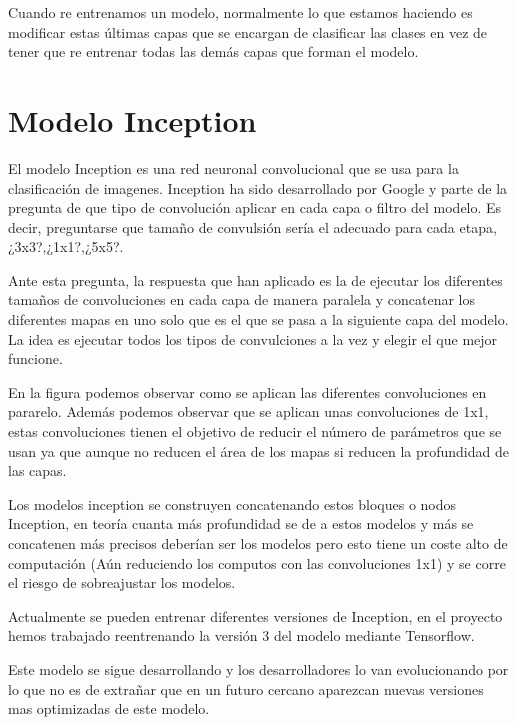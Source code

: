 Cuando re entrenamos un modelo, normalmente lo que estamos haciendo es modificar estas últimas capas que se encargan de clasificar las clases en vez de tener que re entrenar todas las demás capas que forman el modelo.

\section{Modelo Inception}

El modelo Inception es una red neuronal convolucional que se usa para la clasificación de imagenes. Inception ha sido desarrollado por Google y parte de la pregunta de que tipo de convolución aplicar en cada capa o  filtro del modelo. Es decir, preguntarse que tamaño de convulsión sería el adecuado para cada etapa, ¿3x3?,¿1x1?,¿5x5?.

Ante esta pregunta, la respuesta que han aplicado es la de ejecutar los diferentes tamaños de convoluciones en cada capa de manera paralela y concatenar los diferentes mapas en uno solo que es el que se pasa a la siguiente capa del modelo. La idea es ejecutar todos los tipos de convulciones a la vez y elegir el que mejor funcione.


En la figura podemos observar como se aplican las diferentes convoluciones en pararelo. Además podemos observar que se aplican unas convoluciones de 1x1, estas convoluciones tienen el objetivo de reducir el número de parámetros que se usan ya que aunque no reducen el área de los mapas si reducen la profundidad de las capas.

Los modelos inception se construyen concatenando estos bloques o nodos Inception, en teoría cuanta más profundidad se de a estos modelos y más se concatenen más precisos deberían ser los modelos pero esto tiene un coste alto de computación (Aún reduciendo los computos con las convoluciones 1x1) y se corre el riesgo de sobreajustar los modelos.

Actualmente se pueden entrenar diferentes versiones de Inception, en el proyecto hemos trabajado reentrenando la versión 3 del modelo mediante Tensorflow.

Este modelo se sigue desarrollando y los desarrolladores lo van evolucionando por lo que no es de extrañar que en un futuro cercano aparezcan nuevas versiones mas optimizadas de este modelo.


